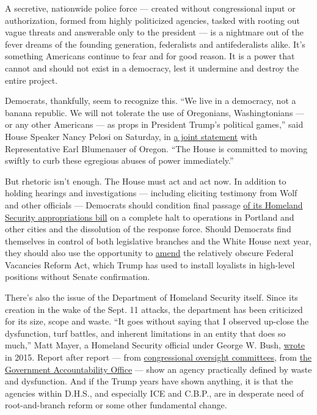 A secretive, nationwide police force --- created without congressional
input or authorization, formed from highly politicized agencies, tasked
with rooting out vague threats and answerable only to the president ---
is a nightmare out of the fever dreams of the founding generation,
federalists and antifederalists alike. It's something Americans continue
to fear and for good reason. It is a power that cannot and should not
exist in a democracy, lest it undermine and destroy the entire project.

Democrats, thankfully, seem to recognize this. ``We live in a democracy,
not a banana republic. We will not tolerate the use of Oregonians,
Washingtonians --- or any other Americans --- as props in President
Trump's political games,'' said House Speaker Nancy Pelosi on Saturday,
in \href{https://www.speaker.gov/newsroom/71820}{a joint statement} with
Representative Earl Blumenauer of Oregon. ``The House is committed to
moving swiftly to curb these egregious abuses of power immediately.''

But rhetoric isn't enough. The House must act and act now. In addition
to holding hearings and investigations --- including eliciting testimony
from Wolf and other officials --- Democrats should condition final
passage
\href{https://appropriations.house.gov/news/press-releases/appropriations-committee-approves-fiscal-year-2021-homeland-security-funding}{of
its Homeland Security appropriations bill} on a complete halt to
operations in Portland and other cities and the dissolution of the
response force. Should Democrats find themselves in control of both
legislative branches and the White House next year, they should also use
the opportunity to
\href{https://slate.com/news-and-politics/2019/04/trump-acting-secretaries-dhs-fvra-senate-reform.html}{amend}
the relatively obscure Federal Vacancies Reform Act, which Trump has
used to install loyalists in high-level positions without Senate
confirmation.

There's also the issue of the Department of Homeland Security itself.
Since its creation in the wake of the Sept. 11 attacks, the department
has been criticized for its size, scope and waste. ``It goes without
saying that I observed up-close the dysfunction, turf battles, and
inherent limitations in an entity that does so much,'' Matt Mayer, a
Homeland Security official under George W. Bush,
\href{http://reason.com/archives/2015/06/23/president-bush-was-right-before-he-was-w}{wrote}
in 2015. Report after report --- from
\href{https://www.hsgac.senate.gov/media/minority-media/final-coburn-oversight-report-finds-major-problems-in-dhs}{congressional
oversight committees}, from
\href{http://www.washingtonpost.com/wp-dyn/content/article/2008/09/16/AR2008091603200_pf.html}{the
Government Accountability Office} --- show an agency practically defined
by waste and dysfunction. And if the Trump years have shown anything, it
is that the agencies within D.H.S., and especially ICE and C.B.P., are
in desperate need of root-and-branch reform or some other fundamental
change.

